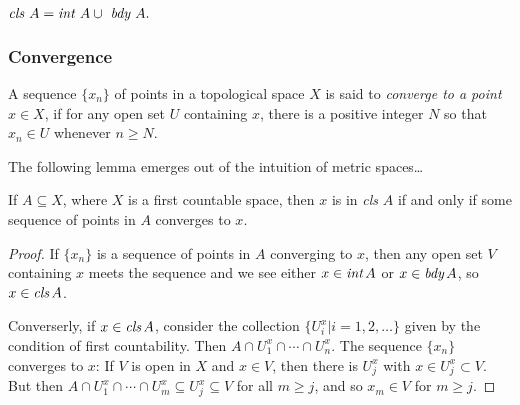 \begin{proposition}
$\emph{cls } A = \emph{int } A \cup \emph{ bdy } A.$
\end{proposition}

\subsubsection{Convergence}\label{convergence}
A sequence $\{ x_n \}$ of points in a topological space $X$ is said to \emph{converge to a point} $x \in X$,
if for any open set $U$ containing $x$, there is a positive integer $N$ so that $x_n \in U$ whenever $n \geq N$.\newline

\noindent The following lemma emerges out of the intuition of metric spaces\dots

\begin{lemma}
\label{sequencelemma}
If $A \subseteq X$, where $X$ is a first countable space, then $x$ is in \emph{cls} $A$ if and only if some sequence of points in $A$ converges to $x$.
\end{lemma}

\begin{proof}
If $\{ x_n \}$ is a sequence of points in $A$ converging to $x$, then any open set $V$ containing $x$ meets the sequence and we see either $x \in \emph{int} \, A$ or $x \in \emph{bdy} \, A$, so
$x \in \emph{cls} \, A$.

Converserly, if $x \in \emph{cls} \, A$, consider the collection $\{ U^x_i | i = 1,2,\dots \}$ given by the condition of first countability. Then $A \cap U^x_1 \cap \cdots \cap U^x_n.$ The sequence $\{ x_n \}$
converges to $x$: If $V$ is open in $X$ and $x \in V$, then there is $U^x_j$ with $x \in U^x_j \subset V$. But then $A \cap U^x_1 \cap \cdots \cap U^x_m \subseteq U^x_j \subseteq V$ for all $m \geq j$, and so $x_m \in V$
for $m \geq j$.
\end{proof}